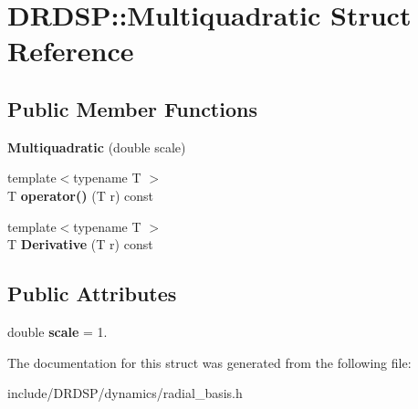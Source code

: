 \hypertarget{struct_d_r_d_s_p_1_1_multiquadratic}{\section{D\-R\-D\-S\-P\-:\-:Multiquadratic Struct Reference}
\label{struct_d_r_d_s_p_1_1_multiquadratic}
}
\subsection*{Public Member Functions}
\begin{DoxyCompactItemize}
\item 
\hypertarget{struct_d_r_d_s_p_1_1_multiquadratic_a9676531016bae341f6c2e9163041b899}{{\bfseries Multiquadratic} (double scale)}\label{struct_d_r_d_s_p_1_1_multiquadratic_a9676531016bae341f6c2e9163041b899}

\item 
\hypertarget{struct_d_r_d_s_p_1_1_multiquadratic_aca54d746ab7b550198d005901bff0470}{{\footnotesize template$<$typename T $>$ }\\T {\bfseries operator()} (T r) const }\label{struct_d_r_d_s_p_1_1_multiquadratic_aca54d746ab7b550198d005901bff0470}

\item 
\hypertarget{struct_d_r_d_s_p_1_1_multiquadratic_a74604d43e27612cd26b42b7e825ca161}{{\footnotesize template$<$typename T $>$ }\\T {\bfseries Derivative} (T r) const }\label{struct_d_r_d_s_p_1_1_multiquadratic_a74604d43e27612cd26b42b7e825ca161}

\end{DoxyCompactItemize}
\subsection*{Public Attributes}
\begin{DoxyCompactItemize}
\item 
\hypertarget{struct_d_r_d_s_p_1_1_multiquadratic_ad075ed2b3b85cab9d74369163eab65cf}{double {\bfseries scale} = 1.}\label{struct_d_r_d_s_p_1_1_multiquadratic_ad075ed2b3b85cab9d74369163eab65cf}

\end{DoxyCompactItemize}


The documentation for this struct was generated from the following file\-:\begin{DoxyCompactItemize}
\item 
include/\-D\-R\-D\-S\-P/dynamics/radial\-\_\-basis.\-h\end{DoxyCompactItemize}
